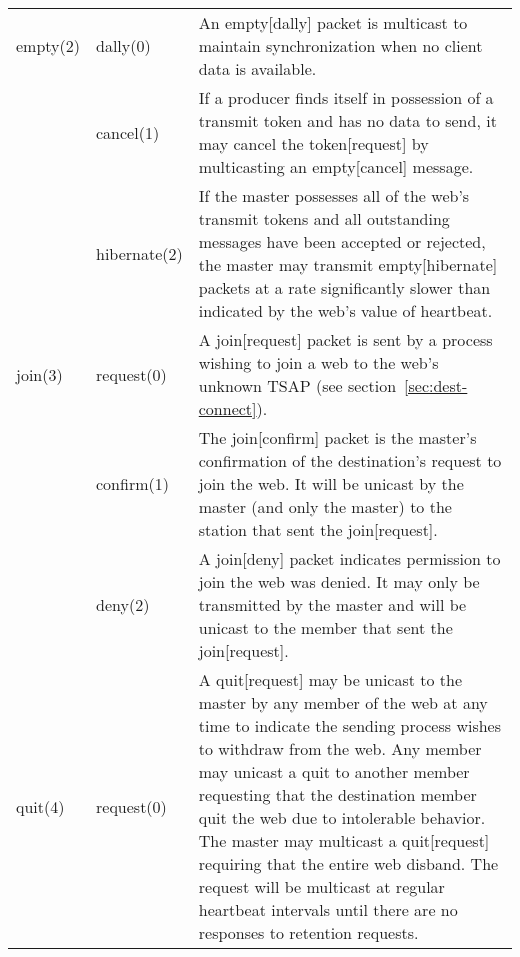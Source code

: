 \documentclass[11pt]{article}
\begin{document}
\begin{center}
\begin{longtable}{llp{}}
   empty(2) & dally(0)   & An empty[dally] packet is multicast to
                           maintain synchronization when no client data
                           is available. \\

            & cancel(1)  & If a producer finds itself in possession of a
                           transmit token and has no data to send, it
                           may cancel the token[request] by multicasting
                           an empty[cancel] message. \\

            & hibernate(2)&If the master possesses all of the web's
                           transmit tokens and all outstanding messages
                           have been accepted or rejected, the master
                           may transmit empty[hibernate] packets at a
                           rate significantly slower than indicated by
                           the web's value of heartbeat. \\

   join(3)  & request(0) & A join[request] packet is sent by a process
                           wishing to join a web to the web's unknown
                           TSAP (see section~\ref{sec:dest-connect}). \\

            & confirm(1) & The join[confirm] packet is the master's
                           confirmation of the destination's request to
                           join the web. It will be unicast by the
                           master (and only the master) to the station
                           that sent the join[request]. \\

            & deny(2)    & A join[deny] packet indicates permission to
                           join the web was denied. It may only be
                           transmitted by the master and will be unicast
                           to the member that sent the join[request]. \\

   quit(4)  & request(0) & A quit[request] may be unicast to the master
                           by any member of the web at any time to
                           indicate the sending process wishes to
                           withdraw from the web. Any member may unicast
                           a quit to another member requesting that the
                           destination member quit the web due to
                           intolerable behavior.  The master may
                           multicast a quit[request] requiring that the
                           entire web disband. The request will be
                           multicast at regular heartbeat intervals
                           until there are no responses to retention
                           requests. \\


\end{longtable}
\end{center}
\end{document}
